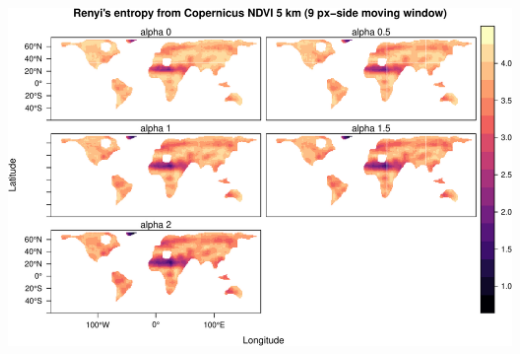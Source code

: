 \documentclass[
]{article}
\begin{document}
\begin{center}\includegraphics[width=0.95\linewidth]{vignettes_rasterdiv_files/figure-latex/fig08-1} \end{center}
\end{document}
